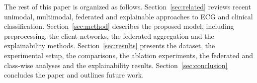 The rest of this paper is organized as follows. Section~\ref{sec:related} reviews recent unimodal,
multimodal, federated and explainable approaches to ECG and clinical classification.
Section~\ref{sec:method} describes the proposed model, including preprocessing, the client
networks, the federated aggregation and the explainability methods. Section~\ref{sec:results}
presents the dataset, the experimental setup, the comparisons, the ablation experiments, the
federated and class-wise analyses and the explainability results. Section~\ref{sec:conclusion}
concludes the paper and outlines future work.
